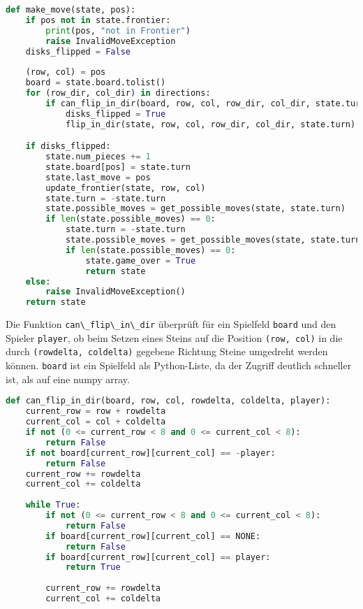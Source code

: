 \begin{lstlisting}[language=Python]
def make_move(state, pos):
    if pos not in state.frontier:
        print(pos, "not in Frontier")
        raise InvalidMoveException
    disks_flipped = False
    
    (row, col) = pos
    board = state.board.tolist()
    for (row_dir, col_dir) in directions:
        if can_flip_in_dir(board, row, col, row_dir, col_dir, state.turn):
            disks_flipped = True
            flip_in_dir(state, row, col, row_dir, col_dir, state.turn)

    if disks_flipped:
        state.num_pieces += 1
        state.board[pos] = state.turn
        state.last_move = pos
        update_frontier(state, row, col)
        state.turn = -state.turn
        state.possible_moves = get_possible_moves(state, state.turn)
        if len(state.possible_moves) == 0:
            state.turn = -state.turn
            state.possible_moves = get_possible_moves(state, state.turn)
            if len(state.possible_moves) == 0:
                state.game_over = True
                return state
    else:
        raise InvalidMoveException()
    return state
\end{lstlisting}

Die Funktion \passthrough{\lstinline!can\_flip\_in\_dir!} überprüft für
ein Spielfeld \passthrough{\lstinline!board!} und den Spieler
\passthrough{\lstinline!player!}, ob beim Setzen eines Steins auf die
Position \passthrough{\lstinline!(row, col)!} in die durch
\passthrough{\lstinline!(rowdelta, coldelta)!} gegebene Richtung Steine
umgedreht werden können. \passthrough{\lstinline!board!} ist ein
Spielfeld als Python-Liste, da der Zugriff deutlich schneller ist, als
auf eine numpy array.

\begin{lstlisting}[language=Python]
def can_flip_in_dir(board, row, col, rowdelta, coldelta, player):
    current_row = row + rowdelta
    current_col = col + coldelta
    if not (0 <= current_row < 8 and 0 <= current_col < 8):
        return False
    if not board[current_row][current_col] == -player:
        return False
    current_row += rowdelta
    current_col += coldelta
    
    while True:
        if not (0 <= current_row < 8 and 0 <= current_col < 8):
            return False
        if board[current_row][current_col] == NONE:
            return False           
        if board[current_row][current_col] == player:
            return True
    
        current_row += rowdelta
        current_col += coldelta
\end{lstlisting}

